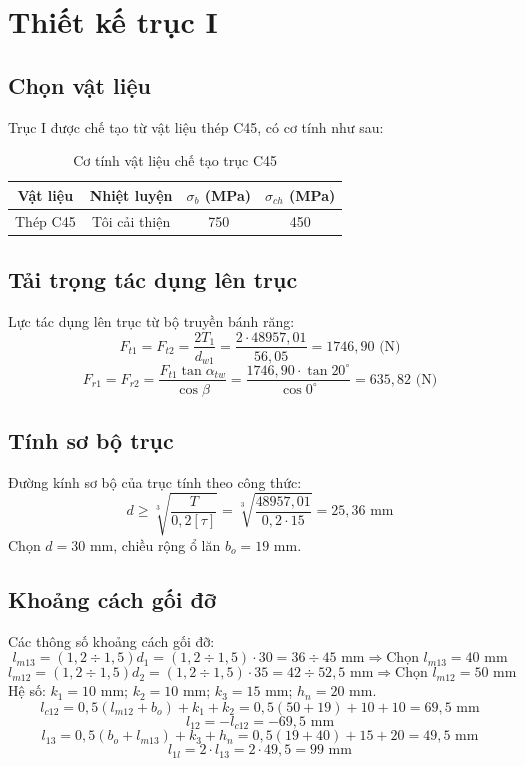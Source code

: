 \documentclass[12pt,a4paper]{report}
\begin{document}
\section{Thiết kế trục I}

\subsection{Chọn vật liệu}
Trục I được chế tạo từ vật liệu thép C45, có cơ tính như sau:

\begin{table}[H]
    \centering
    \caption{Cơ tính vật liệu chế tạo trục C45}
    \label{tab:4.2}
    \begin{tabular}{|c|c|c|c|}
        \hline
        Vật liệu & Nhiệt luyện & $\sigma_b$ (MPa) & $\sigma_{ch}$ (MPa) \\
        \hline
        Thép C45 & Tôi cải thiện & 750 & 450 \\
        \hline
    \end{tabular}
\end{table}

\subsection{Tải trọng tác dụng lên trục}
Lực tác dụng lên trục từ bộ truyền bánh răng:
$$F_{t1} = F_{t2} = \frac{2T_1}{d_{w1}} = \frac{2 \cdot 48957{,}01}{56{,}05} = 1746{,}90 \text{ (N)}$$
$$F_{r1} = F_{r2} = \frac{F_{t1} \tan\alpha_{tw}}{\cos\beta} = \frac{1746{,}90 \cdot \tan 20^\circ}{\cos 0^\circ} = 635{,}82 \text{ (N)}$$

\subsection{Tính sơ bộ trục}
Đường kính sơ bộ của trục tính theo công thức:
$$d \geq \sqrt[3]{\frac{T}{0{,}2[\tau]}} = \sqrt[3]{\frac{48957{,}01}{0{,}2 \cdot 15}} = 25{,}36 \text{ mm}$$
Chọn $d = 30$ mm, chiều rộng ổ lăn $b_o = 19$ mm.

\subsection{Khoảng cách gối đỡ}
Các thông số khoảng cách gối đỡ:
$$l_{m13} = (1{,}2 \div 1{,}5)d_1 = (1{,}2 \div 1{,}5) \cdot 30 = 36 \div 45 \text{ mm} \Rightarrow \text{Chọn } l_{m13} = 40 \text{ mm}$$
$$l_{m12} = (1{,}2 \div 1{,}5)d_2 = (1{,}2 \div 1{,}5) \cdot 35 = 42 \div 52{,}5 \text{ mm} \Rightarrow \text{Chọn } l_{m12} = 50 \text{ mm}$$
Hệ số: $k_1 = 10$ mm; $k_2 = 10$ mm; $k_3 = 15$ mm; $h_n = 20$ mm.
$$l_{c12} = 0{,}5(l_{m12} + b_o) + k_1 + k_2 = 0{,}5(50+19) + 10 + 10 = 69{,}5 \text{ mm}$$
$$l_{12} = -l_{c12} = -69{,}5 \text{ mm}$$
$$l_{13} = 0{,}5(b_o + l_{m13}) + k_3 + h_n = 0{,}5(19+40) + 15 + 20 = 49{,}5 \text{ mm}$$
$$l_{1l} = 2 \cdot l_{13} = 2 \cdot 49{,}5 = 99 \text{ mm}$$
\end{document}
